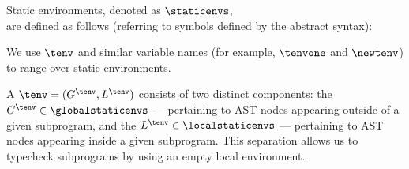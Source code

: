 \begin{definition}
Static environments, denoted as $\staticenvs$, \\
are defined as follows (referring to symbols defined by the abstract syntax):

\end{definition}

We use $\tenv$ and similar variable names (for example, $\tenvone$ and $\newtenv$) to range over static environments.

A \staticenvironmentterm{} $\tenv=(G^\tenv, L^\tenv)$ consists of two
distinct components: the \emph{\globalstaticenvironmentterm} $G^\tenv \in \globalstaticenvs$ --- pertaining to AST nodes
appearing outside of a given subprogram, and the \emph{\localstaticenvironmentterm}
$L^\tenv \in \localstaticenvs$ --- pertaining to AST nodes appearing inside a given subprogram.
This separation allows us to typecheck subprograms by using an empty local environment.

